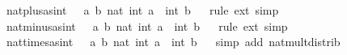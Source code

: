 \begin{isabellebody}
\endisatagproof
{\isafoldproof}%
%
\isadelimproof
%
\endisadelimproof
\isanewline
{}\isamarkupfalse%
\ nat{\isacharunderscore}{\kern0pt}plus{\isacharunderscore}{\kern0pt}as{\isacharunderscore}{\kern0pt}int{\isacharcolon}{\kern0pt}\ {\isachardoublequoteopen}{\isacharparenleft}{\kern0pt}{\isacharplus}{\kern0pt}{\isacharparenright}{\kern0pt}\ {\isacharequal}{\kern0pt}\ {\isacharparenleft}{\kern0pt}{\isasymlambda}a\ b{\isachardot}{\kern0pt}\ nat\ {\isacharparenleft}{\kern0pt}int\ a\ {\isacharplus}{\kern0pt}\ int\ b{\isacharparenright}{\kern0pt}{\isacharparenright}{\kern0pt}{\isachardoublequoteclose}%
\isadelimproof
\ %
\endisadelimproof
%
\isatagproof
{}\isamarkupfalse%
\ {\isacharparenleft}{\kern0pt}rule\ ext{\isacharparenright}{\kern0pt}{\isacharplus}{\kern0pt}\ simp%
\endisatagproof
{\isafoldproof}%
%
\isadelimproof
%
\endisadelimproof
\isanewline
{}\isamarkupfalse%
\ nat{\isacharunderscore}{\kern0pt}minus{\isacharunderscore}{\kern0pt}as{\isacharunderscore}{\kern0pt}int{\isacharcolon}{\kern0pt}\ {\isachardoublequoteopen}{\isacharparenleft}{\kern0pt}{\isacharminus}{\kern0pt}{\isacharparenright}{\kern0pt}\ {\isacharequal}{\kern0pt}\ {\isacharparenleft}{\kern0pt}{\isasymlambda}a\ b{\isachardot}{\kern0pt}\ nat\ {\isacharparenleft}{\kern0pt}int\ a\ {\isacharminus}{\kern0pt}\ int\ b{\isacharparenright}{\kern0pt}{\isacharparenright}{\kern0pt}{\isachardoublequoteclose}%
\isadelimproof
\ %
\endisadelimproof
%
\isatagproof
{}\isamarkupfalse%
\ {\isacharparenleft}{\kern0pt}rule\ ext{\isacharparenright}{\kern0pt}{\isacharplus}{\kern0pt}\ simp%
\endisatagproof
{\isafoldproof}%
%
\isadelimproof
%
\endisadelimproof
\isanewline
{}\isamarkupfalse%
\ nat{\isacharunderscore}{\kern0pt}times{\isacharunderscore}{\kern0pt}as{\isacharunderscore}{\kern0pt}int{\isacharcolon}{\kern0pt}\ {\isachardoublequoteopen}{\isacharparenleft}{\kern0pt}{\isacharasterisk}{\kern0pt}{\isacharparenright}{\kern0pt}\ {\isacharequal}{\kern0pt}\ {\isacharparenleft}{\kern0pt}{\isasymlambda}a\ b{\isachardot}{\kern0pt}\ nat\ {\isacharparenleft}{\kern0pt}int\ a\ {\isacharasterisk}{\kern0pt}\ int\ b{\isacharparenright}{\kern0pt}{\isacharparenright}{\kern0pt}{\isachardoublequoteclose}%
\isadelimproof
\ %
\endisadelimproof
%
\isatagproof
{}\isamarkupfalse%
\ {\isacharparenleft}{\kern0pt}simp\ add{\isacharcolon}{\kern0pt}\ nat{\isacharunderscore}{\kern0pt}mult{\isacharunderscore}{\kern0pt}distrib{\isacharparenright}{\kern0pt}%
\endisatagproof
{\isafoldproof}%
%
\isadelimproof
%
\endisadelimproof
\isanewline
{}\isamarkupfalse%

\end{isabellebody}
